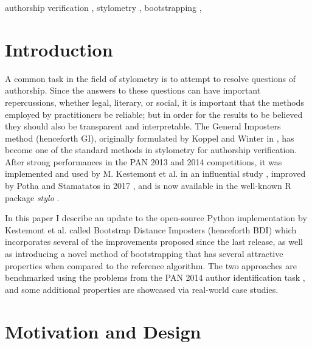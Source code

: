 \documentclass[
    hf
]{ceurart}
\begin{document}
\begin{keywords}
    authorship verification \sep
    stylometry \sep
    bootstrapping \sep
\end{keywords}

\maketitle

\section{Introduction}

A common task in the field of stylometry is to attempt to resolve questions of authorship. Since the
answers to these questions can have important repercussions, whether legal, literary, or social, it
is important that the methods employed by practitioners be reliable; but in order for the results to
be believed they should also be transparent and interpretable. The General Imposters method
(henceforth GI), originally formulated by Koppel and Winter in \cite{koppel_gi}, has become one of
the standard methods in stylometry for authorship verification. After strong performances in
the PAN 2013 and 2014 competitions, it was implemented and used by M. Kestemont et al. in an
influential study \cite{kestemont_caesar}, improved by Potha and Stamatatos in 2017
\cite{potha_improved_gi}, and is now available in the well-known R package \emph{stylo}
\cite{stylo}.

In this paper I describe an update to the open-source Python implementation by Kestemont et al.
\cite{kestemont_ruzicka} called Bootstrap Distance Imposters (henceforth BDI) which incorporates
several of the improvements proposed since the last release, as well as introducing a novel method
of bootstrapping that has several attractive properties when compared to the reference algorithm.
The two approaches are benchmarked using the problems from the PAN 2014 author identification task
\cite{pan_2014}, and some additional properties are showcased via real-world case studies.

\section{Motivation and Design}
\end{document}
